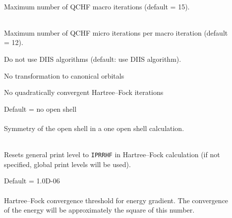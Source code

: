 \begin{description}
\item[]
   \\
  Maximum number of QCHF macro iterations (default = 15).

\item[]
   \\
  Maximum number of QCHF micro iterations per macro iteration (default = 12).

\item[]
  Do not use DIIS algorithms (default: use DIIS algorithm).

\item[]
  No transformation to canonical orbitals

\item[]
  No quadratically convergent Hartree--Fock iterations

\item[]
  Default = no open shell\\
   \\
  Symmetry of the open shell in a one open shell
  calculation.

\item[]
   \\
  Resets general print level to \verb|IPRRHF| in Hartree--Fock calculation
  (if not specified, global print levels will be used).

\item[]
  Default = 1.0D-06\\
   \\
  Hartree--Fock convergence threshold for energy gradient.  The convergence
  of the energy will be approximately the square of this number.

\end{description}



